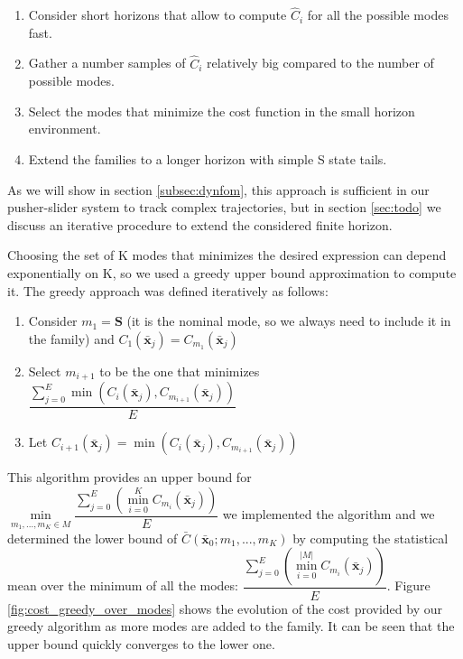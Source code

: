 \documentclass[12,twoside]{TFG-GM}
\theoremstyle{definition}
\theoremstyle{remark}
\newcommand*\diff[1]{\bar{#1}}
\begin{document}
\begin{enumerate}
\item Consider short horizons that allow to compute $\hat{C}_i$ for all the possible modes fast.
\item Gather a number samples of $\hat{C}_i$ relatively big compared to the number of possible modes.
\item Select the modes that minimize the cost function in the small horizon environment.
\item Extend the families to a longer horizon with simple S state tails.
\end{enumerate}

As we will show in section \ref{subsec:dynfom}, this approach is sufficient in our pusher-slider system to track complex trajectories, but in section \ref{sec:todo} we discuss an iterative procedure to extend the considered finite horizon.

Choosing the set of K modes that minimizes the desired expression can depend exponentially on K, so we used a greedy upper bound approximation to compute it. The greedy approach was defined iteratively as follows:
\begin{enumerate}
\item Consider $m_1 = \textbf{S}$ (it is the nominal mode, so we always need to include it in the family) and $C_1(\diff{\textbf{x}}_j) = C_{m_1}(\diff{\textbf{x}}_j)$ 
\item Select $m_{i + 1}$ to be the one that minimizes $\dfrac{\sum\limits_{j = 0}^{E}\min(C_i(\diff{\textbf{x}}_j), C_{m_{i+1}}(\diff{\textbf{x}}_j))}{E}$
\item Let $C_{i+1}(\diff{\textbf{x}}_j) = \min(C_i(\diff{\textbf{x}}_j), C_{m_{i+1}}(\diff{\textbf{x}}_j))$
\end{enumerate}

This algorithm provides an upper bound for $\min\limits_{m_1, ..., m_K \in M} \dfrac{\sum\limits_{j = 0}^{E}(\min\limits_{i = 0}^{K}{C_{m_i}(\diff{\textbf{x}}_j)})}{E}$ we implemented the algorithm and we determined the lower bound of $ \bar{C}(\diff{\textbf{x}}_0; m_1, ..., m_K)$ by computing the statistical mean over the minimum of all the modes: $\dfrac{\sum\limits_{j = 0}^{E}(\min\limits_{i = 0}^{|M|}{C_{m_i}(\diff{\textbf{x}}_j)})}{E}$. Figure \ref{fig:cost_greedy_over_modes} shows the evolution of the cost provided by our greedy algorithm as more modes are added to the family. It can be seen that the upper bound quickly converges to the lower one.
\end{document}
